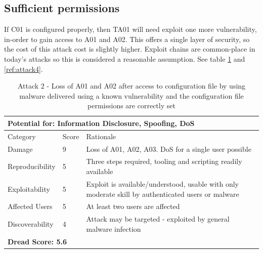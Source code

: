 \documentclass [11pt, proquest] {uwthesis}[2020/02/24]
\begin{document}
\subsection{Sufficient permissions}
If C01 is configured properly, then TA01 will need exploit one more vulnerability, in-order to gain access to A01 and A02. This offers a single layer of security, so the cost of this attack cost is slightly higher. Exploit chains are common-place in today's attacks so this is considered a reasonable assumption.  
See table \ref{ref:attack2} and \ref{ref:attack4}.
\begin{table}[H]

\begin{tabular}{|m{3cm}|m{.9cm}|p{27em} |}
\multicolumn{3}{l}{Potential for: Information Disclosure, Spoofing, DoS}                   \\
\hline
Category & Score & Rationale \\
\hline
Damage          & 9     & Loss of A01, A02, A03. DoS for a single user possible            \\
\hline
Reproducibility & 5     & Three steps required, tooling and scripting readily available    \\
\hline
Exploitability & 5      & Exploit is available/understood, usable with only moderate skill by authenticated users or malware \\
\hline
Affected Users  & 5     & At least two users are affected                      \\
\hline
Discoverability & 4     & Attack may be targeted - exploited by general malware infection \\
\hline
\multicolumn{3}{l}{\textbf{Dread Score: 5.6}} 
\end{tabular}
\caption{Attack 2 - Loss of A01 and A02 after access to configuration file by using malware delivered using a known vulnerability and the configuration file permissions are correctly set}
\label{ref:attack2}
\end{table}
\end{document}

